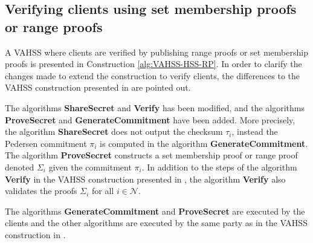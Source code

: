 \subsection*{Verifying clients using set membership proofs or range proofs}
A VAHSS where clients are verified by publishing range proofs or set membership proofs is presented in Construction \ref{alg:VAHSS-HSS-RP}.  In order to clarify the changes made to extend the construction to  verify clients, the differences to the VAHSS construction presented in \cite{SumItUp} are pointed out.

The algorithms \textbf{ShareSecret} and \textbf{Verify} has been modified,  and the algorithms \textbf{ProveSecret} and \textbf{GenerateCommitment} have been added. More precisely, the algorithm \textbf{ShareSecret} does not output the checksum $\tau_i$, instead the Pedersen commitment $\pi_i$ is computed in the algorithm \textbf{GenerateCommitment}. The algorithm \textbf{ProveSecret} constructs a set membership proof or range proof denoted $\Sigma_i$ given the commitment $\pi_i$. 
 In addition to the steps of the algorithm \textbf{Verify} in the VAHSS construction presented in \cite{SumItUp}, the algorithm \textbf{Verify} also validates the proofs $\Sigma_i$ for all $i\in\mathcal{N}$.


The algorithms \textbf{GenerateCommitment} and \textbf{ProveSecret} are executed by the clients and the other algorithms are executed by the same party as in the  VAHSS construction in \cite{SumItUp}. 


